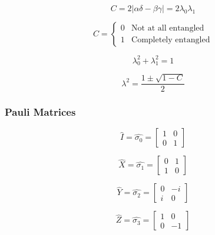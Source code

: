 \documentclass[reprint, amsmath,amssymb, aps]{revtex4-2}
\begin{document}
        \begin{equation} \label{eqn:concurence}
            C = 2|\alpha\delta - \beta\gamma| = 2\lambda_0\lambda_1
        \end{equation}

        \begin{equation} \label{eqn:concurence-meaning}
            C = \begin{cases}0 & \text{Not at all entangled}\\1 & \text{Completely entangled}\end{cases}
        \end{equation}

        \begin{equation} \label{eqn:schmidt}
            \lambda_0^2 + \lambda_1^2 = 1
        \end{equation}

        \begin{equation} \label{eqn:schmidt-conc}
            \lambda^2 = \frac{1\pm\sqrt{1-C}}{2}
        \end{equation}

        \subsubsection{Pauli Matrices}
        \begin{equation} \label{eqn:pauli-i}
            \hat{I} = \hat{\sigma_0} = \begin{bmatrix} 1 & 0 \\ 0 & 1\end{bmatrix}
        \end{equation}

        \begin{equation} \label{eqn:pauli-x}
            \hat{X} = \hat{\sigma_1} = \begin{bmatrix} 0 & 1 \\ 1 & 0\end{bmatrix}
        \end{equation}

        \begin{equation} \label{eqn:pauli-y}
            \hat{Y} = \hat{\sigma_2} = \begin{bmatrix} 0 & -i \\ i & 0\end{bmatrix}
        \end{equation}

        \begin{equation} \label{eqn:pauli-z}
            \hat{Z} = \hat{\sigma_3} = \begin{bmatrix} 1 & 0 \\ 0 & -1\end{bmatrix}
        \end{equation}
\end{document}
